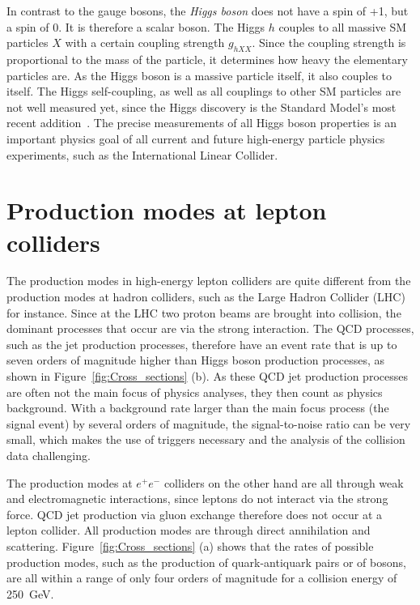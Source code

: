\newpage
In contrast to the gauge bosons, the \textit{Higgs boson} does not have a spin of +1, but a spin of 0.
It is therefore a scalar boson.
The Higgs $h$ couples to all massive SM particles $X$ with a certain coupling strength $g_{hXX}$.
Since the coupling strength is proportional to the mass of the particle, it determines how heavy the elementary particles are.
As the Higgs boson is a massive particle itself, it also couples to itself.
The Higgs self-coupling, as well as all couplings to other SM particles are not well measured yet, since the Higgs discovery is the Standard Model's most recent addition~\cite{Higgs,Higgs2}.
The precise measurements of all Higgs boson properties is an important physics goal of all current and future high-energy particle physics experiments, such as the International Linear Collider. 

\section{Production modes at lepton colliders}
\label{Production_modes}
The production modes in high-energy lepton colliders are quite different from the production modes at hadron colliders, such as the Large Hadron Collider (LHC) for instance.
Since at the LHC two proton beams are brought into collision, the dominant processes that occur are via the strong interaction.
The QCD processes, such as the jet production processes, therefore have an event rate that is up to seven orders of magnitude higher than Higgs boson production processes, as shown in Figure~\ref{fig:Cross_sections} (b).
As these QCD jet production processes are often not the main focus of physics analyses, they then count as physics background.
With a background rate larger than the main focus process (the signal event) by several orders of magnitude, the signal-to-noise ratio can be very small, which makes the use of triggers necessary and the analysis of the collision data challenging.

The production modes at $e^+e^-$ colliders on the other hand are all through weak and electromagnetic interactions, since leptons do not interact via the strong force.
QCD jet production via gluon exchange therefore does not occur at a lepton collider.
All production modes are through direct \positron\electron annihilation and \positron\electron scattering.
Figure~\ref{fig:Cross_sections} (a) shows that the rates of possible production modes, such as the production of quark-antiquark pairs or of bosons, are all within a range of only four orders of magnitude for a collision energy of \SI{250}{\GeV}.

